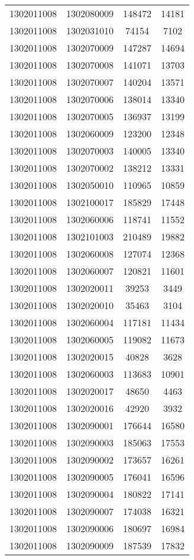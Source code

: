 \begin{longtable}{llcc}
1302011008 & 1302080009 & 148472 & 14181\\
1302011008 & 1302031010 & 74154 & 7102\\
1302011008 & 1302070009 & 147287 & 14694\\
1302011008 & 1302070008 & 141071 & 13703\\
1302011008 & 1302070007 & 140204 & 13571\\
1302011008 & 1302070006 & 138014 & 13340\\
1302011008 & 1302070005 & 136937 & 13199\\
1302011008 & 1302060009 & 123200 & 12348\\
1302011008 & 1302070003 & 140005 & 13340\\
1302011008 & 1302070002 & 138212 & 13331\\
1302011008 & 1302050010 & 110965 & 10859\\
1302011008 & 1302100017 & 185829 & 17448\\
1302011008 & 1302060006 & 118741 & 11552\\
1302011008 & 1302101003 & 210489 & 19882\\
1302011008 & 1302060008 & 127074 & 12368\\
1302011008 & 1302060007 & 120821 & 11601\\
1302011008 & 1302020011 & 39253 & 3449\\
1302011008 & 1302020010 & 35463 & 3104\\
1302011008 & 1302060004 & 117181 & 11434\\
1302011008 & 1302060005 & 119082 & 11673\\
1302011008 & 1302020015 & 40828 & 3628\\
1302011008 & 1302060003 & 113683 & 10901\\
1302011008 & 1302020017 & 48650 & 4463\\
1302011008 & 1302020016 & 42920 & 3932\\
1302011008 & 1302090001 & 176644 & 16580\\
1302011008 & 1302090003 & 185063 & 17553\\
1302011008 & 1302090002 & 173657 & 16261\\
1302011008 & 1302090005 & 176041 & 16596\\
1302011008 & 1302090004 & 180822 & 17141\\
1302011008 & 1302090007 & 174038 & 16321\\
1302011008 & 1302090006 & 180697 & 16984\\
1302011008 & 1302090009 & 187539 & 17832\\

\end{longtable}
